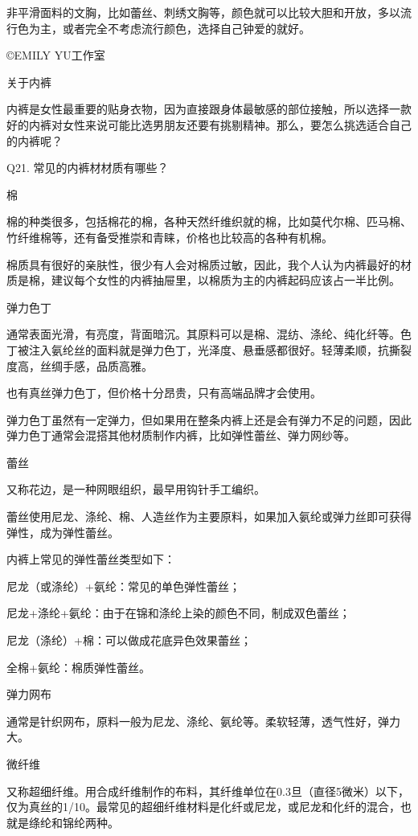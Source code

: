 \documentclass[12pt,UTF8]{ctexbook}
\begin{document}
非平滑面料的文胸，比如蕾丝、刺绣文胸等，颜色就可以比较大胆和开放，多以流行色为主，或者完全不考虑流行颜色，选择自己钟爱的就好。

©EMILY YU工作室





关于内裤


内裤是女性最重要的贴身衣物，因为直接跟身体最敏感的部位接触，所以选择一款好的内裤对女性来说可能比选男朋友还要有挑剔精神。那么，要怎么挑选适合自己的内裤呢？





Q21. 常见的内裤材材质有哪些？


棉

棉的种类很多，包括棉花的棉，各种天然纤维织就的棉，比如莫代尔棉、匹马棉、竹纤维棉等，还有备受推崇和青睐，价格也比较高的各种有机棉。

棉质具有很好的亲肤性，很少有人会对棉质过敏，因此，我个人认为内裤最好的材质是棉，建议每个女性的内裤抽屉里，以棉质为主的内裤起码应该占一半比例。

弹力色丁

通常表面光滑，有亮度，背面暗沉。其原料可以是棉、混纺、涤纶、纯化纤等。色丁被注入氨纶丝的面料就是弹力色丁，光泽度、悬垂感都很好。轻薄柔顺，抗撕裂度高，丝绸手感，品质高雅。

也有真丝弹力色丁，但价格十分昂贵，只有高端品牌才会使用。

弹力色丁虽然有一定弹力，但如果用在整条内裤上还是会有弹力不足的问题，因此弹力色丁通常会混搭其他材质制作内裤，比如弹性蕾丝、弹力网纱等。

蕾丝

又称花边，是一种网眼组织，最早用钩针手工编织。

蕾丝使用尼龙、涤纶、棉、人造丝作为主要原料，如果加入氨纶或弹力丝即可获得弹性，成为弹性蕾丝。

内裤上常见的弹性蕾丝类型如下：

尼龙（或涤纶）+氨纶：常见的单色弹性蕾丝；

尼龙+涤纶+氨纶：由于在锦和涤纶上染的颜色不同，制成双色蕾丝；

尼龙（涤纶）+棉：可以做成花底异色效果蕾丝；

全棉+氨纶：棉质弹性蕾丝。

弹力网布

通常是针织网布，原料一般为尼龙、涤纶、氨纶等。柔软轻薄，透气性好，弹力大。

微纤维

又称超细纤维。用合成纤维制作的布料，其纤维单位在0.3旦（直径5微米）以下，仅为真丝的1/10。最常见的超细纤维材料是化纤或尼龙，或尼龙和化纤的混合，也就是绦纶和锦纶两种。
\end{document}
